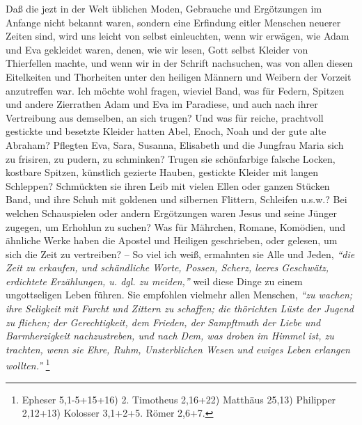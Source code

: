 Daß die jezt in der Welt üblichen Moden, Gebrauche und Ergötzungen im Anfange
nicht bekannt waren, sondern eine Erfindung eitler Menschen neuerer Zeiten sind,
wird uns leicht von selbst einleuchten, wenn wir erwägen, wie
Adam und Eva
gekleidet waren, denen, wie wir lesen, Gott selbst Kleider von Thierfellen
machte, und wenn wir in der Schrift nachsuchen, was von allen diesen Eitelkeiten
und Thorheiten unter den heiligen Männern und
Weibern der Vorzeit anzutreffen
war. Ich möchte wohl fragen, wieviel Band, was für Federn, Spitzen und andere
Zierrathen Adam und Eva im Paradiese, und auch nach ihrer Vertreibung aus
demselben, an sich trugen? Und was für reiche, prachtvoll gestickte und besetzte
Kleider hatten Abel, Enoch,
Noah und der gute alte Abraham?
Pflegten Eva, Sara,
Susanna, Elisabeth und die
Jungfrau Maria sich zu frisiren, zu pudern, zu
schminken? Trugen sie schönfarbige falsche Locken, kostbare Spitzen, künstlich
gezierte Hauben, gestickte Kleider mit langen
Schleppen? Schmückten sie ihren
Leib mit vielen Ellen oder ganzen Stücken Band, und ihre Schuh mit goldenen und
silbernen Flittern, Schleifen u.s.w.? Bei welchen Schauspielen oder andern
Ergötzungen waren Jesus und seine Jünger zugegen, um Erhohlun zu suchen? Was für
Mährchen, Romane, Komödien, und
ähnliche Werke haben die Apostel und Heiligen
geschrieben, oder gelesen, um sich die Zeit zu vertreiben? -- So viel ich weiß,
ermahnten sie Alle und Jeden,
\textit{"`die Zeit zu erkaufen, und schändliche Worte,
Possen, Scherz, leeres Geschwätz, erdichtete Erzählungen, u. dgl. zu meiden,"'}
weil diese Dinge zu einem ungottseligen Leben führen. Sie empfohlen vielmehr
allen Menschen,
\textit{"`zu wachen; ihre Seligkeit mit Furcht und Zittern zu schaffen;
die thörichten Lüste der Jugend zu fliehen; der Gerechtigkeit, dem Frieden, der
Sampftmuth der Liebe und Barmherzigkeit nachzustreben, und nach Dem, was droben
im Himmel ist, zu trachten, wenn sie Ehre, Ruhm, Unsterblichen Wesen und ewiges
Leben erlangen wollten."'}
\footnote{Epheser 5,1-5+15+16)
2. Timotheus 2,16+22)
Matthäus 25,13)
Philipper 2,12+13)
Kolosser 3,1+2+5.
Römer 2,6+7.}

